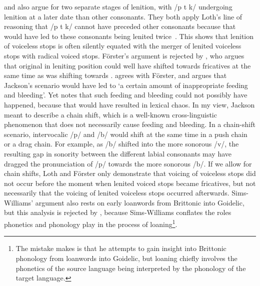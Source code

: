 \Textcite[162]{Foer_Flussname41} and \Textcite{sims-williams_dating_1990} also argue for two separate stages of lenition, with /p t k/ undergoing lenition at a later date than other consonants.
They both apply Loth's line of reasoning that /p t k/ cannot have preceded other consonants because that would have led to these consonants being lenited twice~\autocite[\eg][232]{sims-williams_dating_1990}. This shows that lenition of voiceless stops is often silently equated with the merger of lenited voiceless stops with radical voiced stops. Förster's argument is rejected by \textcite[§~131]{jackson_language_1953}, who argues that original  in leniting position could well have shifted towards fricatives at the same time as  was shifting towards . \Textcite[5]{Tho_Brythonic90} agrees with Förster, and argues that Jackson's scenario would have led to `a certain amount of inappropriate feeding and bleeding'. Yet \textcite[243]{Rus_Introduction95} notes that such feeding and bleeding could not possibly have happened, because that would have resulted in lexical chaos. In my view, Jackson meant to describe a chain shift, which is a well-known cross-linguistic phenomenon that does not necessarily cause feeding and bleeding. In a chain-shift scenario, intervocalic /p/ and /b/ would shift at the same time in a push chain or a drag chain. For example, as /b/ shifted into the more sonorous /v/, the resulting gap in sonority between the different labial consonants may have dragged the pronunciation of /p/ towards the more sonorous /b/. If we allow for chain shifts, Loth and Förster only demonstrate that voicing of voiceless stops did not occur before the moment when lenited voiced stops became fricatives, but not necessarily that the voicing of lenited voiceless stops occurred afterwards.  Sims-Williams' argument also rests on early loanwords from Brittonic into Goidelic, but this analysis is rejected by \textcite{isaac_chronology_2004}, because Sims-Williams conflates the roles  phonetics and phonology play in the process of loaning\footnote{The mistake  \textcite{sims-williams_dating_1990} makes is that he attempts to gain insight into Brittonic phonology from loanwords into Goidelic, but loaning chiefly involves the phonetics of the source language being interpreted by the phonology of the target language.}.

